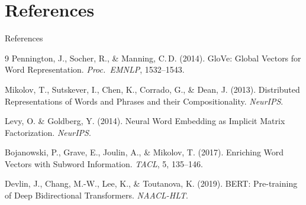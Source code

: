 \documentclass[11pt,aspectratio=169,professionalfonts]{beamer}
\begin{document}
\section{References}
%
\begin{frame}{References}
  \small
  \begin{thebibliography}{9}
      Pennington, J., Socher, R., \& Manning, C.\,D. (2014).
      GloVe: Global Vectors for Word Representation.
      \textit{Proc.\ EMNLP}, 1532--1543.

      Mikolov, T., Sutskever, I., Chen, K., Corrado, G., \& Dean, J. (2013).
      Distributed Representations of Words and Phrases and their Compositionality.
      \textit{NeurIPS}.

      Levy, O. \& Goldberg, Y. (2014).
      Neural Word Embedding as Implicit Matrix Factorization.
      \textit{NeurIPS}.

      Bojanowski, P., Grave, E., Joulin, A., \& Mikolov, T. (2017).
      Enriching Word Vectors with Subword Information.
      \textit{TACL}, 5, 135--146.

      Devlin, J., Chang, M.-W., Lee, K., \& Toutanova, K. (2019).
      BERT: Pre-training of Deep Bidirectional Transformers.
      \textit{NAACL-HLT}.
  \end{thebibliography}
\end{frame}
%
%
\end{document}
